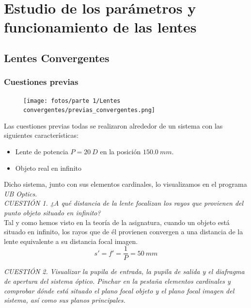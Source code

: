 \documentclass[11pt]{article}
\begin{document}
\vspace{0.3cm}
\tableofcontents
\newpage
\vspace{-0.2cm}


\section{Estudio de los parámetros y funcionamiento de las lentes}
    \subsection{Lentes Convergentes}
    \subsubsection{Cuestiones previas}
    \vspace{0.2cm}
    \begin{figure}
        \vspace{-0.6cm}
        \centering
        \texttt{[image: fotos/parte 1/Lentes convergentes/previas\_convergentes.png]}
    \end{figure}
    
    \noindent Las cuestiones previas todas se realizaron alrededor de un sistema con las siguientes características:
    \begin{itemize}
        \item Lente de potencia $P = 20\ D$ en la posición $150.0\ mm$.
        \item Objeto real en infinito
    \end{itemize}
    Dicho sistema, junto con sus elementos cardinales, lo visualizamos en el programa \textit{UB Optics}.\\
    
    \vspace{5mm}
    \textit{CUESTIÓN 1.  ¿A qué distancia de la lente focalizan los rayos que provienen del punto objeto situado en infinito?}\\
    
    \noindent Tal y como hemos visto en la teoría de la asignatura, cuando un objeto está situado en infinito, los rayos que de él provienen convergen a una distancia de la lente equivalente a su distancia focal imagen.
    \begin{equation*}
        s' = f' = \frac{1}{P} = 50\ mm
    \end{equation*}
    \vspace{10mm}
    
    \textit{CUESTIÓN 2. Visualizar la pupila de entrada, la pupila de salida y el diafragma de apertura del sistema óptico. Pinchar en la pestaña elementos cardinales y comprobar dónde está situado el plano focal objeto y el plano focal imagen del sistema, así como sus planos principales.}\\
    
\end{document}
